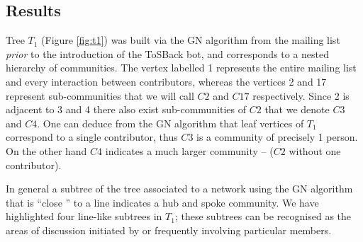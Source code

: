 \documentclass{sig-alternate}
\begin{document}
\subsection{Results}
Tree $T_1$ (Figure \ref{fig:t1}) was built via the GN algorithm from the mailing list \emph{prior} to the introduction of the ToSBack bot, and corresponds to a nested hierarchy of communities. The vertex labelled 1 represents the entire mailing list and every interaction between contributors, whereas the vertices 2 and 17 represent sub-communities that we will call $C2$ and $C17$ respectively. Since 2 is adjacent to 3 and 4 there also exist sub-communities of $C2$ that we denote $C3$ and $C4$. One can deduce from the GN algorithm that leaf vertices of $T_1$ correspond to a single contributor, thus $C3$ is a community of precisely 1 person. On the other hand $C4$ indicates a much larger community – ($C2$ without one contributor).

In general a subtree of the tree associated to a network using the GN algorithm that is “close ” to a line indicates a hub and spoke community. We have highlighted four line-like subtrees in $T_1$; these subtrees can be recognised as the areas of discussion initiated by or frequently involving particular members.
\end{document}
